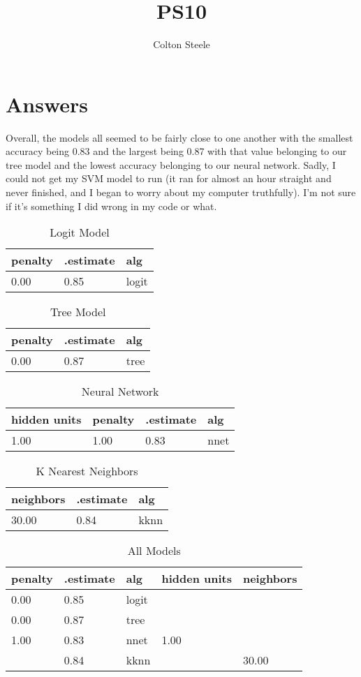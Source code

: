 \documentclass{article}
\title{PS10}
\author{Colton Steele}
\begin{document}
\maketitle


\section{Answers}
Overall, the models all seemed to be fairly close to one another with the smallest accuracy being 0.83 and the largest being 0.87 with that value belonging to our tree model and the lowest accuracy belonging to our neural network. Sadly, I could not get my SVM model to run (it ran for almost an hour straight and never finished, and I began to worry about my computer truthfully). I'm not sure if it's something I did wrong in my code or what.
\begin{table}[ht]
\centering
\caption{Logit Model}
\begin{tabular}[t]{lll}
\toprule
penalty & .estimate & alg\\
\midrule
0.00 & 0.85 & logit\\
\bottomrule
\end{tabular}
\end{table}


\begin{table}[ht]
\centering
\caption{Tree Model}
\begin{tabular}[t]{lll}
\toprule
penalty & .estimate & alg\\
\midrule
0.00 & 0.87 & tree\\
\bottomrule
\end{tabular}
\end{table}

\begin{table}[ht]
\centering
\caption{Neural Network}
\begin{tabular}[t]{llll}
\toprule
hidden units & penalty & .estimate & alg\\
\midrule
1.00 & 1.00 & 0.83 & nnet\\
\bottomrule
\end{tabular}
\end{table}

\begin{table}[ht]
\centering
\caption{K Nearest Neighbors}
\begin{tabular}[t]{lll}
\toprule
neighbors & .estimate & alg\\
\midrule
30.00 & 0.84 & kknn\\
\bottomrule
\end{tabular}
\end{table}

\begin{table}[ht]
\centering
\caption{All Models}
\begin{tabular}[t]{lllll}
\toprule
penalty & .estimate & alg & hidden units & neighbors\\
\midrule
0.00 & 0.85 & logit &  & \\
0.00 & 0.87 & tree &  & \\
1.00 & 0.83 & nnet & 1.00 & \\
 & 0.84 & kknn &  & 30.00\\
\bottomrule
\end{tabular}
\end{table}
\end{document}

